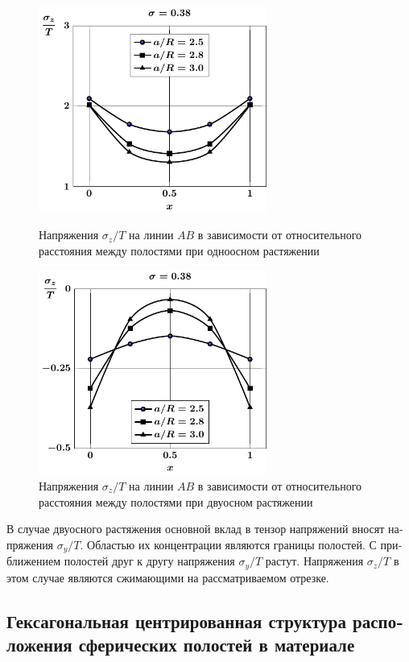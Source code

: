 \begin{russian}
\begin{figure}[th!]
\centering\footnotesize
\parbox[b]{7.5cm}{\centering\includegraphics[width=7.5cm]{spheres-cav9-a-t1-sig_z.pdf}
\caption{Напряжения $\sigma_z/T$ на линии $AB$ в зависимости от относительного расстояния между полостями при одноосном растяжении
\label{f:8:35}}}\hfil\hfil
\parbox[b]{7.5cm}{\centering\includegraphics[width=7.5cm]{spheres-cav9-a-t2-sig_z.pdf}
\caption{Напряжения $\sigma_z/T$ на линии $AB$ в зависимости от относительного расстояния между полостями при двуосном растяжении
\label{f:8:36}}}
\end{figure}

В случае двуосного растяжения основной вклад в тензор напряжений вносят напряжения $\sigma_y/T$. Областью их концентрации являются границы полостей. С приближением полостей друг к другу напряжения $\sigma_y/T$ растут. Напряжения $\sigma_z/T$ в этом случае являются сжимающими на рассматриваемом отрезке.

\subsection{Гексагональная центрированная структура расположения сферических полостей в материале}


\end{russian}
